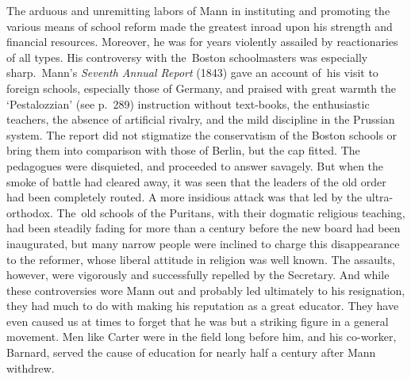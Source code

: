 \documentclass[
]{book}
\begin{document}
The arduous and unremitting labors of Mann in instituting and promoting the various means of school reform made the greatest inroad upon his strength and financial resources. Moreover, he was for years violently assailed by reactionaries of all types. His controversy with the~Boston schoolmasters was especially sharp.~Mann's \emph{Seventh Annual Report} (1843) gave an account of~his visit to foreign schools, especially those of Germany, and praised with great warmth the `Pestalozzian' (see p.~289) instruction without text-books, the enthusiastic teachers, the absence of artificial rivalry, and the mild discipline in the Prussian system. The report did not stigmatize the conservatism of the Boston schools or bring them into comparison with those of Berlin, but the cap fitted. The pedagogues were disquieted, and proceeded to answer savagely. But when the smoke of battle had cleared away, it was seen that the leaders of the old order had been completely routed. A more insidious attack was that led by the ultra-orthodox. The~old schools of the Puritans, with their dogmatic religious teaching, had been steadily fading for more than a century before the new board had been inaugurated, but many narrow people were inclined to charge this disappearance to the reformer, whose liberal attitude in religion was well known. The assaults, however, were vigorously and successfully repelled by the Secretary. And while these controversies wore Mann out and probably led ultimately to his resignation, they had much to do with making his reputation as a great educator. They have even caused us at times to forget that he was but a striking figure in a general movement. Men like Carter were in the field long before him, and his co-worker, Barnard, served the cause of education for nearly half a century after Mann withdrew.
\end{document}
